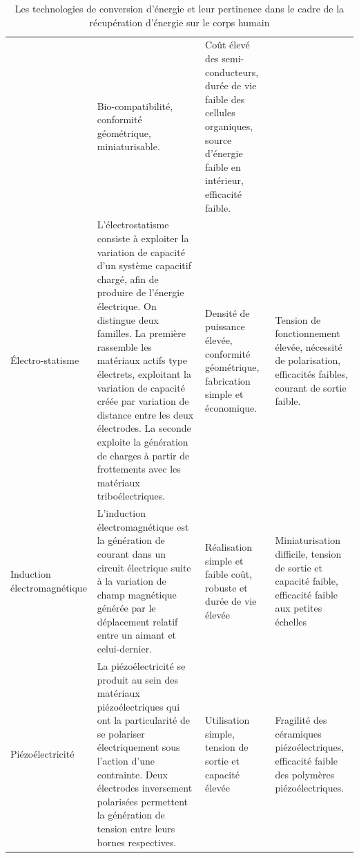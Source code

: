 \begin{table}[!htbp]
{\begin{tabular}{ m{2.5cm} | m{9cm} | m{3.5cm} | m{3.5cm} }
&	Bio-compatibilité, conformité géométrique, miniaturisable.
&	Coût élevé des semi-conducteurs, durée de vie faible des cellules organiques, source d'énergie faible en intérieur, efficacité faible. \\
\mbox{Électro-statisme}							& %
L'électrostatisme consiste à exploiter la variation de capacité d'un système capacitif chargé, afin de produire de l'énergie électrique. On distingue deux familles. La première rassemble les matériaux actifs type électrets, exploitant la variation de capacité créée par variation de distance entre les deux électrodes. La seconde exploite la génération de charges à partir de frottements avec les matériaux triboélectriques. 
& 	Densité de puissance élevée, conformité géométrique, fabrication simple et économique.
&	Tension de fonctionnement élevée, nécessité de polarisation, efficacités faibles, courant de sortie faible. \\
\rowcolor{black!8} 
Induction \mbox{électromagnétique}				& %
L'induction électromagnétique est la génération de courant dans un circuit électrique suite à la variation de champ magnétique générée par le déplacement relatif entre un aimant et celui-dernier.
&	Réalisation simple et faible coût, robuste et durée de vie élevée
&	Miniaturisation difficile, tension de sortie et capacité faible, efficacité faible aux petites échelles \\
\mbox{Piézoélectricité}							& %
La piézoélectricité se produit au sein des matériaux piézoélectriques qui ont la particularité de se polariser électriquement sous l'action d'une contrainte. Deux électrodes inversement polarisées permettent la génération de tension entre leurs bornes respectives.
& Utilisation simple, tension de sortie et capacité élevée
& Fragilité des céramiques piézoélectriques, efficacité faible des polymères piézoélectriques. \\
\bottomrule
\end{tabular}}
\caption{Les technologies de conversion d'énergie et leur pertinence dans le cadre de la récupération d'énergie sur le corps humain}
\label{tab:Technos conversion d energie}
\end{table} 

